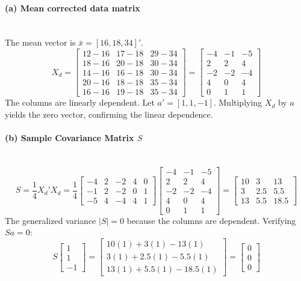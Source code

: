 \documentclass[12pt]{article}
\begin{document}
\paragraph{(a) Mean corrected data matrix} \mbox{} \\
The mean vector is $\bar{x} = [16, 18, 34]'$.
\[
X_d = \begin{bmatrix} 12-16 & 17-18 & 29-34 \\ 18-16 & 20-18 & 30-34 \\ 14-16 & 16-18 & 30-34 \\ 20-16 & 18-18 & 35-34 \\ 16-16 & 19-18 & 35-34 \end{bmatrix} = \begin{bmatrix} -4 & -1 & -5 \\ 2 & 2 & 4 \\ -2 & -2 & -4 \\ 4 & 0 & 4 \\ 0 & 1 & 1 \end{bmatrix}
\]
The columns are linearly dependent. Let $a' = [1, 1, -1]$. Multiplying $X_d$ by $a$ yields the zero vector, confirming the linear dependence.

\paragraph{(b) Sample Covariance Matrix $S$} \mbox{} \\
\[
S = \frac{1}{4} X_d' X_d = \frac{1}{4} \begin{bmatrix} -4 & 2 & -2 & 4 & 0 \\ -1 & 2 & -2 & 0 & 1 \\ -5 & 4 & -4 & 4 & 1 \end{bmatrix} \begin{bmatrix} -4 & -1 & -5 \\ 2 & 2 & 4 \\ -2 & -2 & -4 \\ 4 & 0 & 4 \\ 0 & 1 & 1 \end{bmatrix} = \begin{bmatrix} 10 & 3 & 13 \\ 3 & 2.5 & 5.5 \\ 13 & 5.5 & 18.5 \end{bmatrix}
\]
The generalized variance $|S| = 0$ because the columns are dependent. Verifying $Sa = 0$:
\[
S \begin{bmatrix} 1 \\ 1 \\ -1 \end{bmatrix} = \begin{bmatrix} 10(1) + 3(1) - 13(1) \\ 3(1) + 2.5(1) - 5.5(1) \\ 13(1) + 5.5(1) - 18.5(1) \end{bmatrix} = \begin{bmatrix} 0 \\ 0 \\ 0 \end{bmatrix}
\]
\end{document}
